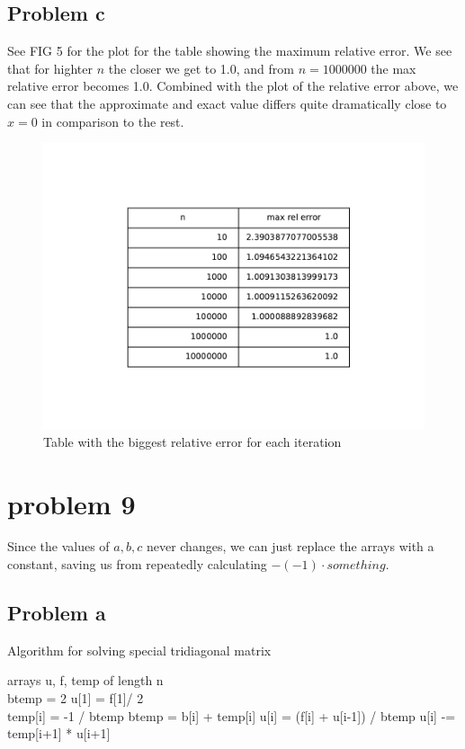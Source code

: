 \documentclass[english,notitlepage]{revtex4-1}  %
\begin{document}
	\subsection*{Problem c}
	See FIG 5 for the plot for the table showing the maximum relative error. We see that for highter $n$ the closer we get to 1.0, and from $n = 1 000 000$ the max relative error becomes 1.0. Combined with the plot of the relative error above, we can see that the approximate and exact value differs quite dramatically close to $x=0$ in comparison to the rest.
		\begin{figure}[H]
			\centering
			\includegraphics[scale=0.75]{plots/biggest_rel_err.pdf} %
			\caption{Table with the biggest relative error for each iteration}
			\label{fig:biggest_rel_err}
		\end{figure}


\section*{problem 9}
	Since the values of $a,b,c$ never changes, we can just replace the arrays with a constant, saving us from repeatedly calculating $- (-1)\cdot{something}$.
	\subsection*{Problem a}
		\begin{algorithm}[H]
			\caption{Algorithm for solving special tridiagonal matrix}
			\begin{algorithmic}
				\State arrays u, f, temp of length n
				\\
				\State btemp = 2
				\State u[1] = f[1]/ 2
				\\
				\State temp[i] = -1 / btemp
				\State btemp = b[i] + temp[i]
				\State u[i] = (f[i] + u[i-1]) / btemp
				\EndFor
				\State u[i] -= temp[i+1] * u[i+1]
				\EndFor
			\end{algorithmic}
		\end{algorithm}
\end{document}
